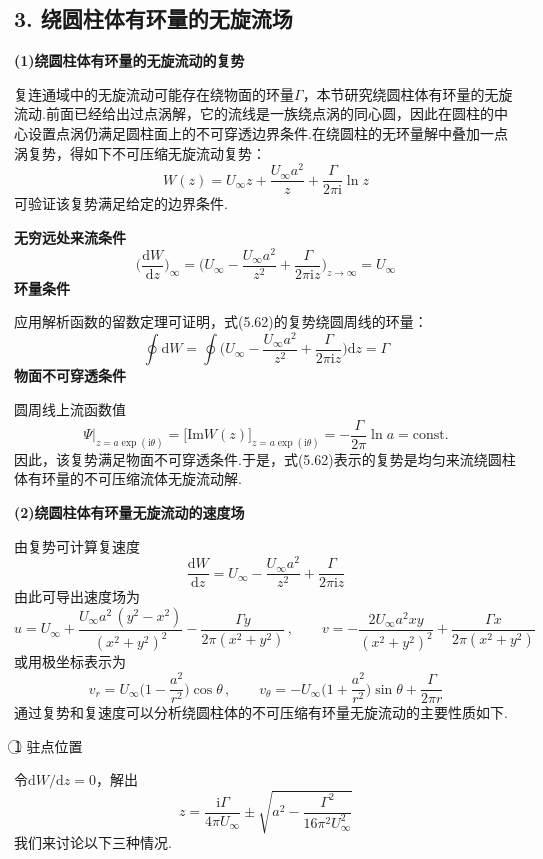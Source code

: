 \subsection*{3. 绕圆柱体有环量的无旋流场}

\textbf{(1)绕圆柱体有环量的无旋流动的复势}

复连通域中的无旋流动可能存在绕物面的环量$\Gamma$，本节研究绕圆柱体有环量的无旋流动.前面已经给出过点涡解，它的流线是一族绕点涡的同心圆，因此在圆柱的中心设置点涡仍满足圆柱面上的不可穿透边界条件.在绕圆柱的无环量解中叠加一点涡复势，得如下不可压缩无旋流动复势：
\begin{equation*}
W(z)=U_\infty z+\frac{U_\infty a^{2}}{z}+\frac{\Gamma}{2\pi\mathrm{i}}\ln z
\tag{5.62}
\end{equation*}
可验证该复势满足给定的边界条件.

\textbf{无穷远处来流条件}
\[
\Big(\frac{\mathrm{d}W}{\mathrm{d}z}\Big)_\infty=\Big(U_\infty-\frac{U_\infty a^{2}}{z^{2}}+\frac{\Gamma}{2\pi\mathrm{i}z}\Big)_{z\to\infty}=U_\infty
\]
\textbf{环量条件}

应用解析函数的留数定理可证明，式(5.62)的复势绕圆周线的环量：
\[
\oint\mathrm{d}W=\oint\Big(U_\infty-\frac{U_\infty a^{2}}{z^{2}}+\frac{\Gamma}{2\pi\mathrm{i}z}\Big)\mathrm{d}z=\Gamma
\]
\textbf{物面不可穿透条件}

圆周线上流函数值
\[
\Psi\big|_{z=a\exp(\mathrm{i}\theta)}=\big[\mathrm{Im}W(z)\big]_{z=a\exp(\mathrm{i}\theta)}=-\frac{\Gamma}{2\pi}\ln a=\mathrm{const.}
\]
因此，该复势满足物面不可穿透条件.于是，式(5.62)表示的复势是均匀来流绕圆柱体有环量的不可压缩流体无旋流动解.

\textbf{(2)绕圆柱体有环量无旋流动的速度场}

由复势可计算复速度
\begin{equation*}
\frac{\mathrm{d}W}{\mathrm{d}z}=U_\infty-\frac{U_\infty a^{2}}{z^{2}}+\frac{\Gamma}{2\pi\mathrm{i}z}
\tag{5.63}
\end{equation*}
由此可导出速度场为
\[
u=U_\infty+\frac{U_\infty a^{2}\,(y^{2}-x^{2})}{(x^{2}+y^{2})^{2}}-\frac{\Gamma y}{2\pi(x^{2}+y^{2})}\,,\qquad v=-\frac{2U_\infty a^{2}xy}{(x^{2}+y^{2})^{2}}+\frac{\Gamma x}{2\pi(x^{2}+y^{2})}
\]
或用极坐标表示为
\[
v_r=U_\infty\Big(1-\frac{a^{2}}{r^{2}}\Big)\cos\theta\,,\qquad v_\theta=-U_\infty\Big(1+\frac{a^{2}}{r^{2}}\Big)\sin\theta+\frac{\Gamma}{2\pi r}
\]
通过复势和复速度可以分析绕圆柱体的不可压缩有环量无旋流动的主要性质如下.

\textcircled{1} 驻点位置

令$\mathrm{d}W/\mathrm{d}z=0$，解出
\begin{equation*}
z=\frac{\mathrm{i}\Gamma}{4\pi U_\infty}\pm\sqrt{a^{2}-\frac{\Gamma^{2}}{16\pi^{2}U_\infty^{2}}}
\tag{5.64}
\end{equation*}
我们来讨论以下三种情况.

